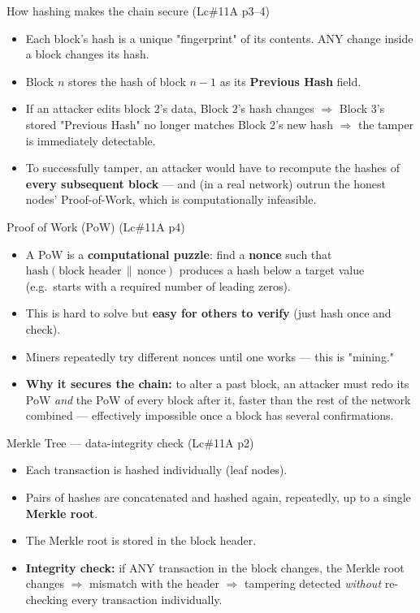 \documentclass[12pt,a4paper]{article}
\begin{document}
\begin{keybox}{How hashing makes the chain secure (Lc\#11A p3--4)}
\begin{itemize}[noitemsep]
  \item Each block's hash is a unique "fingerprint" of its contents. ANY change inside a block changes its hash.
  \item Block $n$ stores the hash of block $n-1$ as its \textbf{Previous Hash} field.
  \item If an attacker edits block 2's data, Block 2's hash changes $\Rightarrow$ Block 3's stored "Previous Hash" no longer matches Block 2's new hash $\Rightarrow$ the tamper is immediately detectable.
  \item To successfully tamper, an attacker would have to recompute the hashes of \textbf{every subsequent block} --- and (in a real network) outrun the honest nodes' Proof-of-Work, which is computationally infeasible.
\end{itemize}
\end{keybox}

\begin{algobox}{Proof of Work (PoW) (Lc\#11A p4)}
\begin{itemize}[noitemsep]
  \item A PoW is a \textbf{computational puzzle}: find a \textbf{nonce} such that $\text{hash}(\text{block header} \,\|\, \text{nonce})$ produces a hash below a target value (e.g.\ starts with a required number of leading zeros).
  \item This is hard to solve but \textbf{easy for others to verify} (just hash once and check).
  \item Miners repeatedly try different nonces until one works --- this is "mining."
  \item \textbf{Why it secures the chain:} to alter a past block, an attacker must redo its PoW \emph{and} the PoW of every block after it, faster than the rest of the network combined --- effectively impossible once a block has several confirmations.
\end{itemize}
\end{algobox}

\begin{keybox}{Merkle Tree --- data-integrity check (Lc\#11A p2)}
\begin{itemize}[noitemsep]
  \item Each transaction is hashed individually (leaf nodes).
  \item Pairs of hashes are concatenated and hashed again, repeatedly, up to a single \textbf{Merkle root}.
  \item The Merkle root is stored in the block header.
  \item \textbf{Integrity check:} if ANY transaction in the block changes, the Merkle root changes $\Rightarrow$ mismatch with the header $\Rightarrow$ tampering detected \emph{without} re-checking every transaction individually.
\end{itemize}
\end{keybox}
\end{document}
